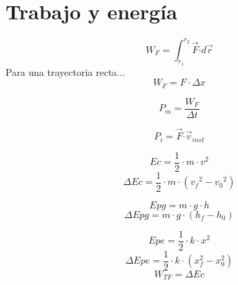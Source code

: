 
\section{Trabajo y energía}
    \begin{equation}
        W_F = \int_{r_1}^{r_2} \Vec{F} \boldsymbol{\cdot} d\vec{r}
    \end{equation}
    Para una trayectoria recta...
    \begin{equation*}
        W_F = F \cdot \Delta x
    \end{equation*}

    \newpage
    
    \begin{equation}
        P_m = \frac{W_F}{\Delta t}
    \end{equation}
    
    \begin{equation}
        P_i = \Vec{F} \boldsymbol{\cdot} \vec{v}_{inst}
    \end{equation}
    
    \begin{equation}
        Ec = \frac{1}{2}\cdot m \cdot v^2
    \end{equation}
    \begin{equation*}
        \Delta Ec = \frac{1}{2}\cdot m \cdot ({v_f}^2 - {v_0}^2)
    \end{equation*}
        
    \begin{equation}
        Epg = m \cdot g \cdot h
    \end{equation}
    \begin{equation*}
        \Delta Epg = m \cdot g \cdot (h_f - h_0)
    \end{equation*}

    \begin{equation}
        Epe = \frac{1}{2} \cdot k \cdot x^2
    \end{equation}
    \begin{equation*}
        \Delta Epe = \frac{1}{2} \cdot k \cdot (x_f^2 - x_0^2)
    \end{equation*}
    \begin{equation}
        W_{TF} = \Delta Ec
    \end{equation}
    
